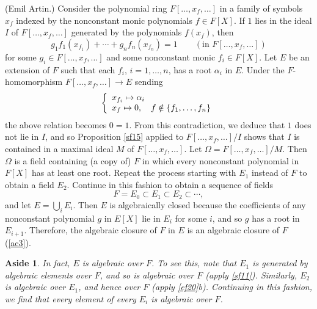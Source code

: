 \documentclass[a4paper,11pt,final,openany]{memoir}
\newtheorem{aside}[X]{Aside}
\theoremstyle{nonumberplain}
\begin{document}
(Emil Artin.) Consider the polynomial ring $F[\ldots,x_{f},\ldots]$ in a
family of symbols $x_{f}$ indexed by the nonconstant monic polynomials $f\in
F[X]$. If $1$ lies in the ideal $I$ of $F[\ldots,x_{f},\ldots]$ generated by
the polynomials $f(x_{f})$, then%
\[
g_{1}f_{1}(x_{f_{1}})+\cdots+g_{n}f_{n}(x_{f_{n}})=1\qquad(\text{in }%
F[\ldots,x_{f},\ldots])
\]
for some $g_{i}\in F[\ldots,x_{f},\ldots]$ and some nonconstant monic
$f_{i}\in F[X]$. Let $E$ be an extension of $F$ such that each $f_{i}$,
$i=1,\ldots,n$, has a root $\alpha_{i}$ in $E$. Under the $F$-homomorphism
$F[\ldots,x_{f},\ldots]\rightarrow E$ sending
\[
\left\{
\begin{array}
[c]{l}%
x_{f_{i}}\mapsto\alpha_{i}\\
x_{f}\mapsto0,\quad f\notin\{f_{1},\ldots,f_{n}\}
\end{array}
\right.
\]
the above relation becomes $0=1$. From this contradiction, we deduce that $1$
does not lie in $I$, and so Proposition \ref{sf15} applied to $F[\ldots
,x_{f},\ldots]/I$ shows that $I$ is contained in a maximal ideal $M$ of
$F[\ldots,x_{f},\ldots]$. Let $\Omega=F[\ldots,x_{f},\ldots]/M$. Then $\Omega$
is a field containing (a copy of) $F$ in which every nonconstant polynomial in
$F[X]$ has at least one root. Repeat the process starting with $E_{1}$ instead
of $F$ to obtain a field $E_{2}$. Continue in this fashion to obtain a
sequence of fields%
\[
F=E_{0}\subset E_{1}\subset E_{2}\subset\cdots,
\]
and let $E=\bigcup\nolimits_{i}E_{i}$. Then $E$ is algebraically closed
because the coefficients of any nonconstant polynomial $g$ in $E[X]$ lie in
$E_{i}$ for some $i$, and so $g$ has a root in $E_{i+1}$. Therefore, the
algebraic closure of $F$ in $E$ is an algebraic closure of $F$ (\ref{ac3}).

\begin{aside}
\label{sf15b}In fact, $E$ is algebraic over $F$. To see this, note that
$E_{1}$ is generated by algebraic elements over $F$, and so is algebraic over
$F$ (apply \ref{sf11}). Similarly, $E_{2}$ is algebraic over $E_{1}$, and
hence over $F$ (apply \ref{ef20}b). Continuing in this fashion, we find that
every element of every $E_{i}$ is algebraic over $F$.
\end{aside}
\end{document}
